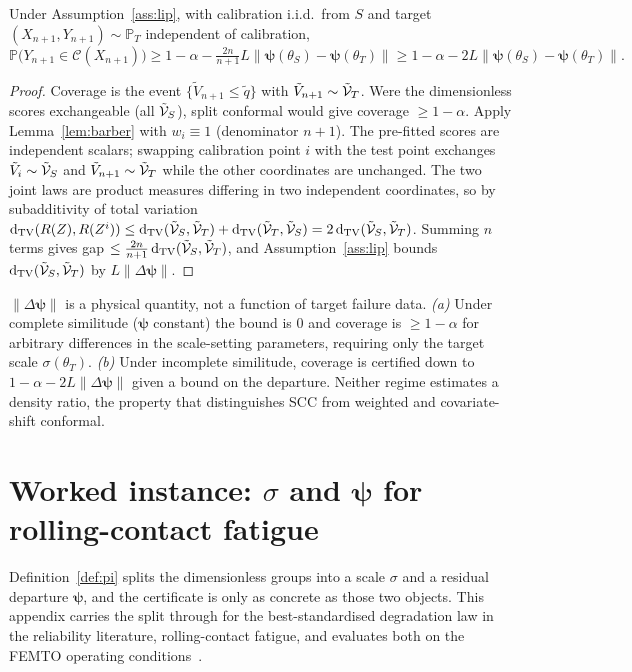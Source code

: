 \begin{theorem}\label{thm:scc}
Under Assumption~\ref{ass:lip}, with calibration i.i.d.\ from $S$ and target
$(X_{n+1},Y_{n+1})\sim\mathbb P_T$ independent of calibration,
\[
\mathbb P\big(Y_{n+1}\in\mathcal C(X_{n+1})\big)\ge
1-\alpha-\tfrac{2n}{n+1}L\lVert\boldsymbol\psi(\theta_S)-\boldsymbol\psi(\theta_T)\rVert
\ge 1-\alpha-2L\lVert\boldsymbol\psi(\theta_S)-\boldsymbol\psi(\theta_T)\rVert.
\]
\end{theorem}
\begin{proof}
Coverage is the event $\{\tilde V_{n+1}\le\tilde q\}$ with $\tilde V_{n+1}\sim\tilde{\mathcal{V}}_{T}$. Were the
dimensionless scores exchangeable (all $\tilde{\mathcal{V}}_{S}$), split conformal would give coverage $\ge1-\alpha$.
Apply Lemma~\ref{lem:barber} with $w_i\equiv1$ (denominator $n+1$). The pre-fitted scores are
independent scalars; swapping calibration point $i$ with the test point exchanges
$\tilde V_i\sim\tilde{\mathcal{V}}_{S}$ and $\tilde V_{n+1}\sim\tilde{\mathcal{V}}_{T}$ while the other coordinates are unchanged. The
two joint laws are product measures differing in two independent coordinates, so by subadditivity of
total variation $\operatorname{d_{\mathrm{TV}}}(R(Z),R(Z^i))\le\operatorname{d_{\mathrm{TV}}}(\tilde{\mathcal{V}}_{S},\tilde{\mathcal{V}}_{T})+\operatorname{d_{\mathrm{TV}}}(\tilde{\mathcal{V}}_{T},\tilde{\mathcal{V}}_{S})=2\operatorname{d_{\mathrm{TV}}}(\tilde{\mathcal{V}}_{S},\tilde{\mathcal{V}}_{T})$.
Summing $n$ terms gives gap $\le\tfrac{2n}{n+1}\operatorname{d_{\mathrm{TV}}}(\tilde{\mathcal{V}}_{S},\tilde{\mathcal{V}}_{T})$, and Assumption~\ref{ass:lip}
bounds $\operatorname{d_{\mathrm{TV}}}(\tilde{\mathcal{V}}_{S},\tilde{\mathcal{V}}_{T})$ by $L\lVert\Delta\boldsymbol\psi\rVert$.
\end{proof}

\begin{corollary}\label{cor:apriori}
$\lVert\Delta\boldsymbol\psi\rVert$ is a physical quantity, not a function of target failure data.
\emph{(a)} Under complete similitude ($\boldsymbol\psi$ constant) the bound is $0$ and coverage is
$\ge1-\alpha$ for arbitrary differences in the scale-setting parameters, requiring only the target
scale $\sigma(\theta_T)$. \emph{(b)} Under incomplete similitude, coverage is certified down to
$1-\alpha-2L\lVert\Delta\boldsymbol\psi\rVert$ given a bound on the departure. Neither regime estimates
a density ratio, the property that distinguishes SCC from weighted and covariate-shift conformal.
\end{corollary}

\section{Worked instance: $\sigma$ and $\boldsymbol\psi$ for rolling-contact fatigue}\label{app:bearing}
Definition~\ref{def:pi} splits the dimensionless groups into a scale $\sigma$ and a residual
departure $\boldsymbol\psi$, and the certificate is only as concrete as those two objects. This
appendix carries the split through for the best-standardised degradation law in the reliability
literature, rolling-contact fatigue, and evaluates both on the FEMTO operating
conditions~\cite{nectoux2012pronostia}.

